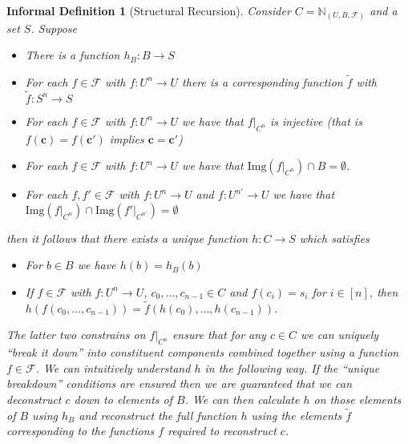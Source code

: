 \documentclass[12pt]{article}
\theoremstyle{break}
\theoremstyle{break}
\theoremstyle{break}
\theoremstyle{break}
\theoremstyle{break}
\newtheorem{informal definition}[definition]{Informal Definition}
\theoremstyle{break}
\newtheorem{informal theorem}[theorem]{Informal Theorem}
\newcommand{\bv}[1]{\boldsymbol{#1}}
\newcommand{\mc}[1]{\mathcal{#1}}
\newcommand{\qq}[1]{``#1''}
\newcommand{\natnum}[0]{\mathbb{N}}
\newcommand{\UBF}[0]{(U, B, \mc{F})}
\newcommand{\NUBF}[0]{\natnum_{\UBF}}
\begin{document}
\begin{informal definition}[Structural Recursion]
Consider $C = \NUBF$ and a set $S$.
Suppose
\begin{itemize}
\item{There is a function $h_B: B \to S$}
\item{For each $f\in \mc{F}$ with $f: U^n \to U$ there is a corresponding function $\tilde{f}$ with $\tilde{f}:S^n \to S$}
\item{For each $f\in \mc{F}$ with $f:U^n \to U$ we have that $f|_{C^n}$ is injective (that is $f(\bv{c}) = f(\bv{c}')$ implies $\bv{c}=\bv{c}'$)}
\item{For each $f \in \mc{F}$ with $f:U^n \to U$ we have that $\text{Img}(f|_{C^n}) \cap B = \emptyset$.}
\item{For each $f, f' \in \mc{F}$ with $f:U^n \to U$ and $f:U^{n'} \to U$ we have that $\text{Img}(f|_{C^n}) \cap \text{Img}(f'|_{C^{n'}}) = \emptyset$}
\end{itemize}
then it follows that there exists a unique function $h:C \to S$ which satisfies
\begin{itemize}
\item{For $b\in B$ we have $h(b) = h_B(b)$}
\item{If $f\in \mc{F}$ with $f:U^n \to U$, $c_0, \ldots, c_{n-1} \in C$ and $f(c_i) = s_i$ for $i \in [n]$, then $h(f(c_0, \ldots, c_{n-1})) = \tilde{f}(h(c_0), \ldots, h(c_{n-1}))$.}
\end{itemize}

The latter two constrains on $f|_{C^n}$ ensure that for any $c\in C$ we can uniquely \qq{break it down} into constituent components combined together using a function $f\in \mc{F}$.
We can intuitively understand $h$ in the following way.
If the \qq{unique breakdown} conditions are ensured then we are guaranteed that we can deconstruct $c$ down to elements of $B$.
We can then calculate $h$ on those elements of $B$ using $h_B$ and reconstruct the full function $h$ using the elements $\tilde{f}$ corresponding to the functions $f$ required to reconstruct $c$.
\end{informal definition}
\end{document}
